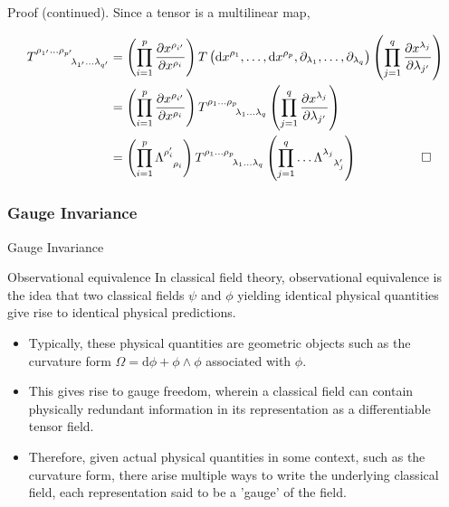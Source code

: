 \documentclass[9pt,handout]{beamer}
\begin{document}
\begin{frame}
\begin{block}{Proof (continued).}
Since a tensor is a multilinear map,
	
\begin{align*}
T^{\rho_{1^\prime} \dots \rho_{p^\prime}}_{\phantom{\rho_{1^\prime} \dots \rho_{p^\prime}} \lambda_{1^\prime} \dots \lambda_{q^\prime}} & = \left( \prod_{i=1}^{p} \frac{\partial x^{\rho_{i^\prime}}}{\partial x^{\rho_i}} \right) T \left( \text{d}x^{\rho_1}, \dots, \text{d}x^{\rho_p}, \partial_{\lambda_1}, \dots, \partial_{\lambda_q} \right) \left( \prod_{j=1}^{q} \frac{\partial x^{\lambda_j}}{\partial \lambda_{j^\prime}} \right) \\
& = \left( \prod_{i=1}^{p} \frac{\partial x^{\rho_{i^\prime}}}{\partial x^{\rho_i}} \right) T^{\rho_1 \dots \rho_p}_{\phantom{\rho_1 \dots \rho_p} \lambda_1 \dots \lambda_q} \left( \prod_{j=1}^{q} \frac{\partial x^{\lambda_j}}{\partial \lambda_{j^\prime}} \right) \\
& = \left( \prod_{i=1}^{p} \Lambda^{\rho_i^\prime}_{\phantom{\rho_i^\prime} \rho_i} \right) T^{\rho_1 \dots \rho_p}_{\phantom{\rho_1 \dots \rho_p} \lambda_1 \dots \lambda_q} \left( \prod_{j=1}^{q} \dots \Lambda^{\lambda_j}_{\phantom{\lambda_j} \lambda_j^\prime} \right) \qquad \quad \qed
\end{align*}
\end{block}
\end{frame}

\subsubsection{Gauge Invariance}
\begin{frame}{Gauge Invariance}
\begin{block}{Observational equivalence}
In classical field theory, observational equivalence is the idea that two classical fields $\psi$ and $\phi$ yielding identical physical quantities give rise to identical physical predictions.
\end{block}

\begin{itemize}
\item Typically, these physical quantities are geometric objects such as the curvature form $\Omega = \text{d}\phi + \phi \wedge \phi$ associated with $\phi$.
\item This gives rise to gauge freedom, wherein a classical field can contain physically redundant information in its representation as a differentiable tensor field. 
\item Therefore, given actual physical quantities in some context, such as the curvature form, there arise multiple ways to write the underlying classical field, each representation said to be a 'gauge' of the field.
\end{itemize} 
\end{frame}
\end{document}

